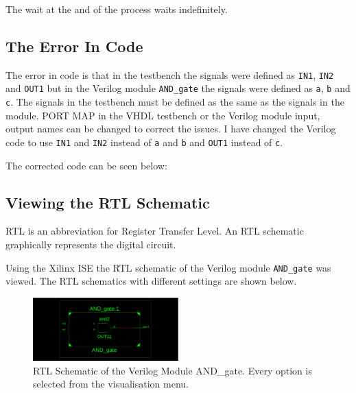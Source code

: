 \documentclass{article}
\begin{document}
The wait at the and of the process waits indefinitely.

\subsection*{The Error In Code}

The error in code is that in the testbench the signals were defined as \verb|IN1|, \verb|IN2| and \verb|OUT1| but in the Verilog module \verb|AND_gate| the signals were defined as \verb|a|, \verb|b| and \verb|c|. The signals in the testbench must be defined as the same as the signals in the module.
PORT MAP in the VHDL testbench or the Verilog module input, output names can be changed to correct the issues. I have changed the Verilog code to use \verb|IN1| and \verb|IN2| instead of \verb|a| and \verb|b| and \verb|OUT1| instead of \verb|c|.

The corrected code can be seen below:

\begin{center} %
    \lstset{
  caption= Corrected AND\_gate.v, 
  basicstyle=\footnotesize, frame=tb,
  xleftmargin=.2\textwidth, xrightmargin=.2\textwidth
}
    

\end{center}




\subsection*{Viewing the RTL Schematic}

RTL is an abbreviation for Register Transfer Level. An RTL schematic graphically represents the digital circuit.

Using the Xilinx ISE the RTL schematic of the Verilog module \verb|AND_gate| was viewed. The RTL schematics with different settings are shown below.


\begin{figure}[H] %
    \centering
    \includegraphics[width=0.5\textwidth]{rtlall.png} %
    \caption{RTL Schematic of the Verilog Module AND\_gate. Every option is selected from the visualisation menu.} %
    \label{fig:rtlall} %
\end{figure}
\end{document}

